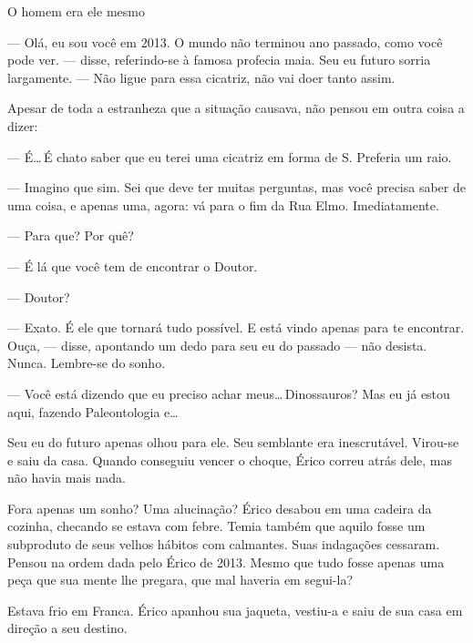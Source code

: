 O homem era ele mesmo

--- Olá, eu sou você em 2013. O mundo não terminou ano passado, como
você pode ver. --- disse, referindo-se à famosa profecia maia. Seu eu
futuro sorria largamente. --- Não ligue para essa cicatriz, não vai doer
tanto assim.

Apesar de toda a estranheza que a situação causava, não pensou em outra
coisa a dizer:

--- É\ldots\,É chato saber que eu terei uma cicatriz em forma de S.
Preferia um raio.

--- Imagino que sim. Sei que deve ter muitas perguntas, mas você precisa
saber de uma coisa, e apenas uma, agora: vá para o fim da Rua Elmo.
Imediatamente.

--- Para que? Por quê?

--- É lá que você tem de encontrar o Doutor.

--- Doutor?

--- Exato. É ele que tornará tudo possível. E está vindo apenas para te
encontrar. Ouça, --- disse, apontando um dedo para seu eu do passado ---
não desista. Nunca. Lembre-se do sonho.

--- Você está dizendo que eu preciso achar meus\ldots\,Dinossauros? Mas
eu já estou aqui, fazendo Paleontologia e\ldots

Seu eu do futuro apenas olhou para ele. Seu semblante era inescrutável.
Virou-se e saiu da casa. Quando conseguiu vencer o choque, Érico correu
atrás dele, mas não havia mais nada.

Fora apenas um sonho? Uma alucinação? Érico desabou em uma cadeira da
cozinha, checando se estava com febre. Temia também que aquilo fosse um
subproduto de seus velhos hábitos com calmantes. Suas indagações
cessaram. Pensou na ordem dada pelo Érico de 2013. Mesmo que tudo fosse
apenas uma peça que sua mente lhe pregara, que mal haveria em segui-la?

Estava frio em Franca. Érico apanhou sua jaqueta, vestiu-a e saiu de sua
casa em direção a seu destino.
